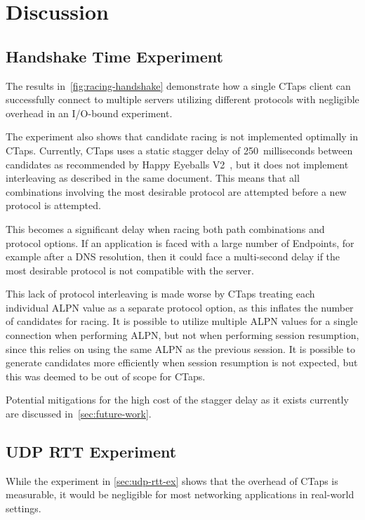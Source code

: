 \section{Discussion} \label{sec:discussion}
\subsection{Handshake Time Experiment}\label{sec:single-endpoint-handshake-discussion}
The results in~\cref{fig:racing-handshake} 
demonstrate how a single CTaps client can successfully connect to multiple
servers utilizing different protocols with negligible overhead in an I/O-bound experiment.

The experiment also shows that candidate racing
is not implemented optimally in CTaps.
Currently, CTaps uses a static stagger delay
of 250~milliseconds between candidates as recommended by Happy Eyeballs V2~\cite{rfc8305}, but it does
not implement interleaving as described in the same document.
This means that all combinations involving the most desirable protocol are attempted
before a new protocol is attempted.

This becomes a significant delay
when racing both path combinations and protocol options.
If an application is faced with a large number of Endpoints,
for example after a DNS resolution,
then it could face a multi-second delay
if the most desirable protocol is
not compatible with the server.

This lack of protocol interleaving is made worse by CTaps treating
each individual ALPN value as a separate protocol option, as this
inflates the number of candidates for racing.
It is possible to utilize multiple ALPN values for a
single connection when performing ALPN, but not when performing
session resumption, since this relies on using the same ALPN as
the previous session. It is possible to generate candidates
more efficiently when session resumption is not expected,
but this was deemed to be out of scope for CTaps.

Potential mitigations for the high cost of the stagger delay as
it exists currently are discussed in~\cref{sec:future-work}.

\subsection{UDP RTT Experiment}
While the experiment in \cref{sec:udp-rtt-ex} shows that the overhead of CTaps is measurable,
it would be negligible for most networking applications in real-world
settings.

